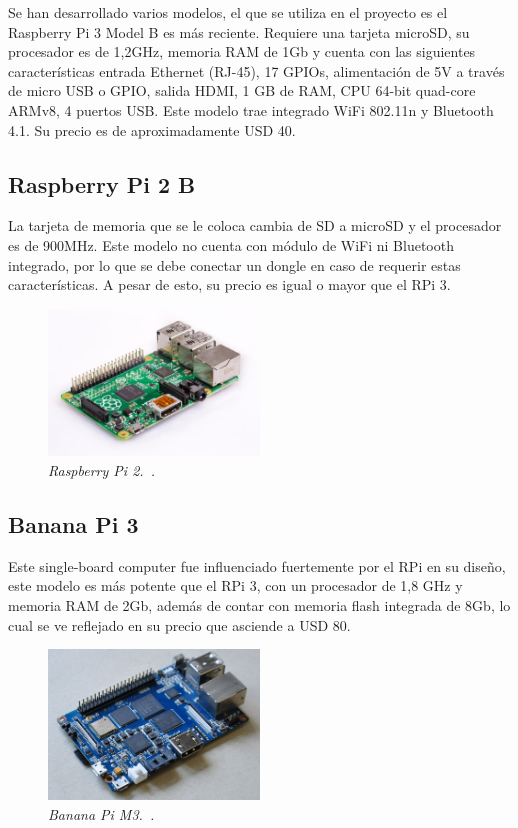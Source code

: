 Se han desarrollado varios modelos, el que se utiliza en el proyecto es el Raspberry Pi 3 Model B es más reciente.
Requiere una tarjeta microSD, su procesador es de 1,2GHz, memoria RAM de 1Gb y cuenta con las siguientes características entrada Ethernet (RJ-45), 17 GPIOs, alimentación de 5V a través de micro USB o GPIO, salida HDMI, 1 GB de RAM, CPU 64-bit quad-core ARMv8, 4 puertos USB.
Este modelo trae integrado WiFi 802.11n y Bluetooth 4.1.
Su precio es de aproximadamente USD 40.

\subsection{Raspberry Pi 2 B}

La tarjeta de memoria que se le coloca cambia de SD a microSD y el procesador es de 900MHz. Este modelo no cuenta con módulo de WiFi ni Bluetooth integrado, por lo que se debe conectar un dongle en caso de requerir estas características. A pesar de esto, su precio es igual o mayor que el RPi 3.

\begin{figure}[h!]
  \centering
  \includegraphics[width=0.5\textwidth, keepaspectratio]{images/rpi2}
  \caption{\textit{Raspberry Pi 2.~\cite{RPi2}.}}
  \label{fig:rpi2}
\end{figure}

\subsection{Banana Pi 3}
Este single-board computer fue influenciado fuertemente por el RPi en su diseño, este modelo es más potente que el RPi 3, con un procesador de 1,8 GHz y memoria RAM de 2Gb, además de contar con memoria flash integrada de 8Gb, lo cual se ve reflejado en su precio que asciende a USD 80. 

\begin{figure}[h!]
  \centering
  \includegraphics[width=0.5\textwidth, keepaspectratio]{images/bpi3}
  \caption{\textit{Banana Pi M3.~\cite{Banana3}.}}
  \label{fig:bpi3}
\end{figure}

